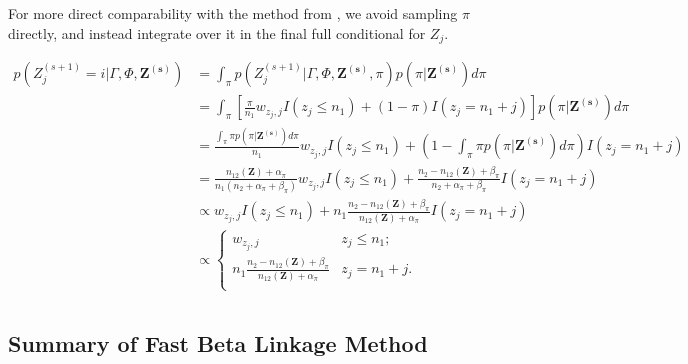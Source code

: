 \documentclass[ba]{imsart}
\begin{document}
For more direct comparability with the method from \cite{sadinle_bayesian_2017}, we avoid sampling $\pi$ directly, and instead integrate over it in the final full conditional for $Z_j$.

\begin{align*}
	p\left(Z_j^{(s+1)}  = i| \Gamma, \Phi, \bm{Z^{(s)}}\right) &= \int_{\pi}p\left(Z_j^{(s+1)} | \Gamma, \Phi, \bm{Z^{(s)}}, \pi\right) p\left(\pi| \bm{Z^{(s)}}\right) d\pi \\
	&= \int_{\pi}\left[\frac{\pi}{n_1}w_{z_{j}, j} I(z_j\leq n_1) + (1-\pi)I(z_j = n_1 + j)\right] p\left(\pi| \bm{Z^{(s)}}\right) d\pi \\
	&= \frac{\int_{\pi} \pi p\left(\pi| \bm{Z^{(s)}}\right) d\pi}{n_1}w_{z_{j}, j} I(z_j\leq n_1) + \left(1-\int_{\pi} \pi p\left(\pi| \bm{Z^{(s)}}\right) d\pi \right) I(z_j = n_1 + j) \\
	&= \frac{n_{12}(\bm{Z}) + \alpha_{\pi}}{n_1 (n_2 + \alpha_{\pi} + \beta_{\pi})}w_{z_{j}, j} I(z_j\leq n_1) + \frac{n_2 - n_{12}(\bm{Z}) + \beta_{\pi}}{n_2 + \alpha_{\pi} + \beta_{\pi}}I(z_j = n_1 + j) \\
	&\propto w_{z_j, j}I(z_j\leq n_1) + n_1 \frac{n_2 - n_{12}(\bm{Z}) + \beta_{\pi}}{n_{12}(\bm{Z}) + \alpha_{\pi}}I(z_j = n_1 + j) \\
	&\propto 
	\begin{cases} 
		w_{z_j, j}  & z_j \leq n_1; \\
		n_1 \frac{n_2 - n_{12}(\bm{Z}) + \beta_{\pi}}{n_{12}(\bm{Z}) + \alpha_{\pi}} & z_j   = n_1 + j. \\
	\end{cases} \\
\end{align*}

	\clearpage
	
	\hypertarget{app:fabl-psuedocode}{%
		\subsection{Summary of Fast Beta Linkage Method}\label{app:fabl-psuedocode}}
	
\end{document}
